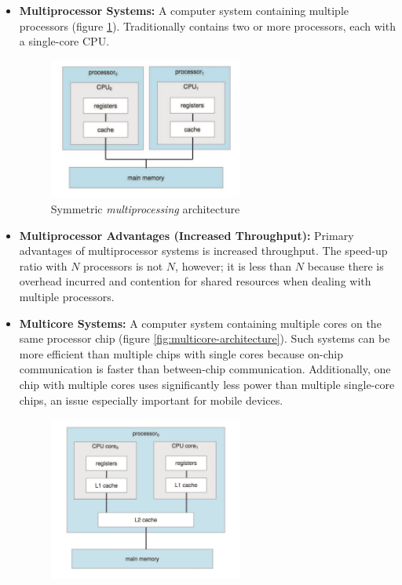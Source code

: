 \documentclass[12pt]{article}
\begin{document}
\begin{itemize}
    \item \textbf{Multiprocessor Systems:} A computer system containing multiple processors (figure \ref{fig:symmetric-multiprocessing-architecture}). Traditionally contains two or more processors, each with a single-core CPU.
        \begin{figure}[ht]
            \centering
            \includegraphics[width=0.6\textwidth]{figures/symmetric-multiprocessing-architecture.jpg}
            \caption{Symmetric \textit{multiprocessing} architecture}
            \label{fig:symmetric-multiprocessing-architecture}
        \end{figure}
    \item \textbf{Multiprocessor Advantages (Increased Throughput):} Primary advantages of multiprocessor systems is increased throughput. The speed-up ratio with \(N\) processors is not \(N\), however; it is less than \(N\) because there is overhead incurred and contention for shared resources when dealing with multiple processors.
    \item \textbf{Multicore Systems:} A computer system containing multiple cores on the same processor chip (figure \ref{fig:multicore-architecture}). Such systems can be more efficient than multiple chips with single cores because on-chip communication is faster than between-chip communication. Additionally, one chip with multiple cores uses significantly less power than multiple single-core chips, an issue especially important for mobile devices.
        \begin{figure}[ht]
            \centering
            \includegraphics[width=0.6\textwidth]{figures/multicore-architecture.jpg}

\end{figure}
\end{itemize}
\end{document}
